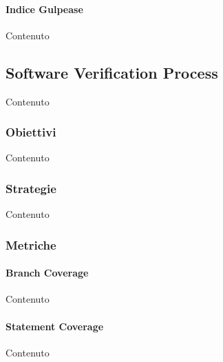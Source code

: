     \paragraph{Indice Gulpease}
    Contenuto


    \subsection{Software Verification Process}
    Contenuto

    \subsubsection{Obiettivi}
    Contenuto

    \subsubsection{Strategie}
    Contenuto


    \subsubsection{Metriche}

    \paragraph{Branch Coverage}
    Contenuto

    \paragraph{Statement Coverage}
    Contenuto